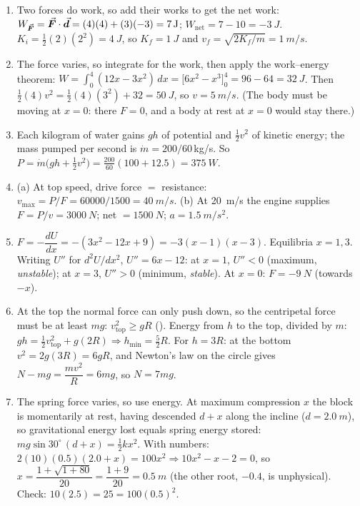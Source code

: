 \begin{enumerate}[label=\textbf{\arabic*.},itemsep=5pt]
\item Two forces do work, so add their works to get the net work: $W_{\vec{\bm{F}}}=\vec{\bm{F}}\cdot\vec{\bm{d}}=(4)(4)+(3)(-3)=\SI{7}{J}$;
$W_{\text{net}}=7-10=\SI{-3}{J}$.
$K_i=\tfrac12(2)(2^2)=\SI{4}{J}$, so $K_f=\SI{1}{J}$ and $v_f=\sqrt{2K_f/m}=\SI{1}{m/s}$. 

\item The force varies, so integrate for the work, then apply the work--energy theorem:
$W=\int_0^4(12x-3x^2)\,dx=\big[6x^2-x^3\big]_0^4=96-64=\SI{32}{J}$. Then
$\tfrac12(4)v^2=\tfrac12(4)(3^2)+32=\SI{50}{J}$, so $v=\SI{5}{m/s}$. (The body must be moving at $x=0$:
there $F=0$, and a body at rest at $x=0$ would stay there.) 

\item Each kilogram of water gains $gh$ of potential and $\tfrac12v^2$ of kinetic energy; the mass pumped
per second is $\dot m=200/60\,$kg/s. So $P=\dot m\big(gh+\tfrac12v^2\big)=\tfrac{200}{60}(100+12.5)
=\SI{375}{W}$. 

\item (a) At top speed, drive force $=$ resistance: $v_{\max}=P/F=60000/1500=\SI{40}{m/s}$.
(b) At \SI{20}{m/s} the engine supplies $F=P/v=\SI{3000}{N}$; net $=\SI{1500}{N}$;
$a=\SI{1.5}{m/s^2}$. 

\item $F=-\dfrac{dU}{dx}=-(3x^2-12x+9)=-3(x-1)(x-3)$. Equilibria $x=1,3$. Writing $U''$ for
$d^2U/dx^2$, $U''=6x-12$: at $x=1$,
$U''<0$ (maximum, \emph{unstable}); at $x=3$, $U''>0$ (minimum, \emph{stable}). At $x=0$:
$F=\SI{-9}{N}$ (towards $-x$). 

\item At the top the normal force can only push down, so the centripetal force must be at least $mg$:
$v_{\text{top}}^2\ge gR$ (). Energy from $h$ to the top, divided by $m$:
$g h=\tfrac12 v_{\text{top}}^2+g(2R)\Rightarrow h_{\min}=\tfrac52 R$. For $h=3R$: at the bottom
$v^2=2g(3R)=6gR$, and Newton's law on the circle gives $N-mg=\dfrac{mv^2}{R}=6mg$, so $N=7mg$.

\item The spring force varies, so use energy. At maximum compression $x$ the block is momentarily at rest,
having descended $d+x$ along the incline ($d=\SI{2.0}{m}$), so gravitational energy lost equals spring
energy stored:
$mg\sin30^\circ\,(d+x)=\tfrac12kx^2$. With numbers: $2(10)(0.5)(2.0+x)=100x^2\Rightarrow
10x^2-x-2=0$, so $x=\dfrac{1+\sqrt{1+80}}{20}=\dfrac{1+9}{20}=\SI{0.5}{m}$ (the other root,
$-0.4$, is unphysical). Check: $10(2.5)=25=100(0.5)^2$.\ \checkmark {}


\end{enumerate}
